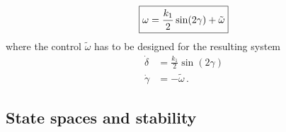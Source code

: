 \documentclass[journal,twoside,web]{ieeecolor}
\theoremstyle{definition}
\begin{document}
\begin{equation}
\label{eq-omega-general}
\fbox{$\omega = \dfrac{k_1}{2} \sin(2\gamma) +\tilde\omega$}
\end{equation}
where the control $\tilde\omega$ has to be designed for the resulting system
\begin{subequations}
\label{eq:unicycle_polar_closed_loop-Gv-3-pass}
\begin{align}
\label{eq:unicycle_polar_closed_loop-Gv-3n-pass}
\dot{\delta} &=  \frac{k_1}{2} \sin(2\gamma)\\ \label{eq:unicycle_polar_closed_loop-Gv-3a-pass}
\dot{\gamma} &= -\tilde\omega\,.
\end{align} 
\end{subequations}



\subsection{State spaces and stability} %
\end{document}
